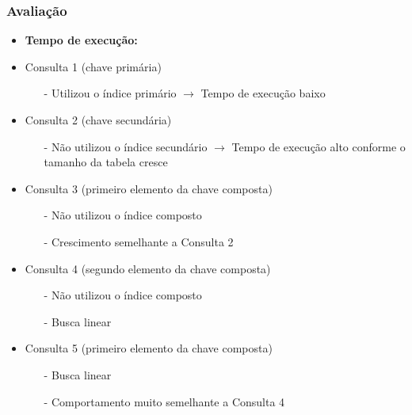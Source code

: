 \documentclass[10pt]{beamer}
\begin{document}
\begin{frame}[fragile]
  \frametitle{Avaliação}

  \begin{itemize}

    \item \textbf{Tempo de execução:}

    \item Consulta 1 (chave primária)
      \begin{itemize}
        \item[-] Utilizou o índice primário $\to$ Tempo de execução baixo
      \end{itemize}

    \item Consulta 2 (chave secundária)
      \begin{itemize}
        \item[-] Não utilizou o índice secundário $\to$ Tempo de execução alto conforme o tamanho da tabela cresce 
      \end{itemize}

    \item Consulta 3 (primeiro elemento da chave composta)
      \begin{itemize}
        \item[-] Não utilizou o índice composto
        \item[-] Crescimento semelhante a Consulta 2
      \end{itemize}

    \item Consulta 4 (segundo elemento da chave composta)
      \begin{itemize}
        \item[-] Não utilizou o índice composto
        \item[-] Busca linear
      \end{itemize}

    \item Consulta 5 (primeiro elemento da chave composta)
      \begin{itemize}
        \item[-] Busca linear
        \item[-] Comportamento muito semelhante a Consulta 4
      \end{itemize}


  \end{itemize}


\end{frame}
\end{document}
